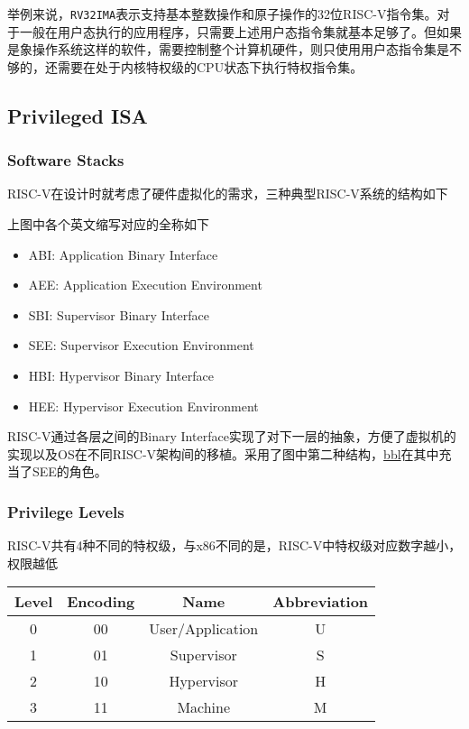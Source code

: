 举例来说，\texttt{RV32IMA}表示支持基本整数操作和原子操作的32位RISC-V指令集。对于一般在用户态执行的应用程序，只需要上述用户态指令集就基本足够了。但如果是象操作系统这样的软件，需要控制整个计算机硬件，则只使用用户态指令集是不够的，还需要在处于内核特权级的CPU状态下执行特权指令集。

\subsection{Privileged ISA}\label{privileged-isa}

\subsubsection{Software Stacks}\label{software-stacks}

RISC-V在设计时就考虑了硬件虚拟化的需求，三种典型RISC-V系统的结构如下


上图中各个英文缩写对应的全称如下

\begin{itemize}
\item
  ABI: Application Binary Interface
\item
  AEE: Application Execution Environment
\item
  SBI: Supervisor Binary Interface
\item
  SEE: Supervisor Execution Environment
\item
  HBI: Hypervisor Binary Interface
\item
  HEE: Hypervisor Execution Environment
\end{itemize}

RISC-V通过各层之间的Binary
Interface实现了对下一层的抽象，方便了虚拟机的实现以及OS在不同RISC-V架构间的移植。采用了图中第二种结构，\href{https://github.com/riscv/riscv-pk}{bbl}在其中充当了SEE的角色。

\subsubsection{Privilege Levels}\label{privilege-levels}

RISC-V共有4种不同的特权级，与x86不同的是，RISC-V中特权级对应数字越小，权限越低

\begin{longtable}[c]{@{}cccc@{}}
\toprule
Level & Encoding & Name & Abbreviation\tabularnewline
\midrule
\endhead
0 & 00 & User/Application & U\tabularnewline
1 & 01 & Supervisor & S\tabularnewline
2 & 10 & Hypervisor & H\tabularnewline
3 & 11 & Machine & M\tabularnewline
\bottomrule
\end{longtable}

